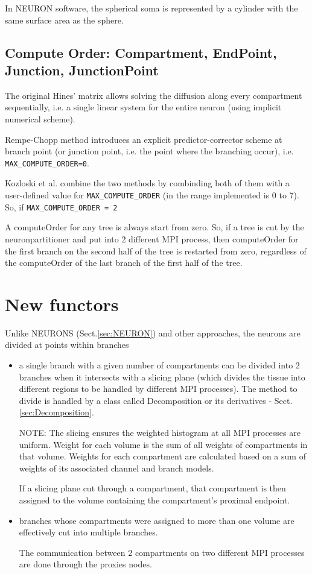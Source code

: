 \begin{mdframed}

In NEURON software, the spherical soma is represented by a cylinder with the
same surface area as the sphere.
\end{mdframed}




\subsection{Compute Order: Compartment, EndPoint, Junction, JunctionPoint}

The original Hines' matrix allows solving the diffusion along every compartment
sequentially, i.e. a single linear system for the entire neuron (using implicit
numerical scheme).

Rempe-Chopp method introduces an explicit predictor-corrector scheme at branch
point (or junction point, i.e. the point where the branching occur), i.e. 
\verb!MAX_COMPUTE_ORDER=0!.

Kozloski et al. combine the two methods by combinding both of them with 
a user-defined value for \verb!MAX_COMPUTE_ORDER! (in the range implemented is
0 to 7). So, if \verb!MAX_COMPUTE_ORDER = 2!

A computeOrder for any tree is always start from zero. So, if a tree is cut by
the neuronpartitioner and put into 2 different MPI process, then computeOrder
for the first branch on the second half of the tree is restarted from zero,
regardless of the computeOrder of the last branch of the first half of the tree.


\section{New functors}

Unlike NEURONS (Sect.\ref{sec:NEURON}) and other approaches, 
the neurons are divided at points within branches
\begin{itemize}
  \item a single branch with a given number of compartments
  can be divided into 2 branches when it intersects with a slicing plane
  (which divides the tissue into different regions to be handled by different
  MPI processes). The method to divide is handled by a class called
  Decomposition or its derivatives - Sect.\ref{sec:Decomposition}.
  
NOTE: The slicing ensures the weighted histogram at all MPI processes are
uniform. Weight for each volume is the sum of all weights of compartments in
that volume. Weights for each compartment are calculated based on a sum of
weights of its associated channel and branch models.

If a slicing plane cut through a compartment, that compartment is then assigned
to the volume containing the compartment's proximal endpoint.
  
  \item branches whose compartments were assigned to more than one volume are
  effectively cut into multiple branches.
  
The communication between 2 compartments on two different MPI processes are done
through the proxies nodes.
\end{itemize}

